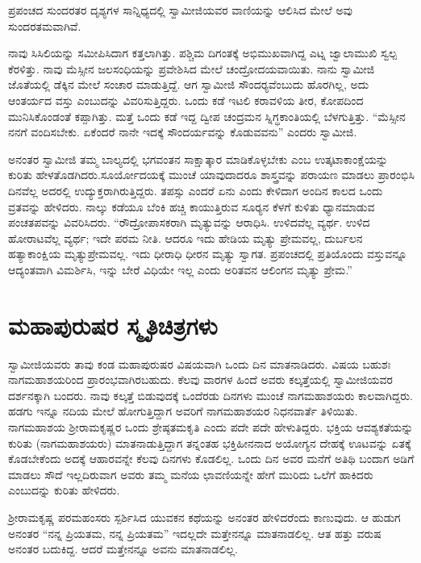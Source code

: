  ಪ್ರಪಂಚದ ಸುಂದರತರ ದೃಶ್ಯಗಳ ಸಾನ್ನಿಧ್ಯದಲ್ಲಿ ಸ್ವಾಮೀಜಿಯವರ ವಾಣಿಯನ್ನು ಆಲಿಸಿದ ಮೇಲೆ ಅವು ಸುಂದರತಮವಾಗಿವೆ. 

 ನಾವು ಸಿಸಿಲಿಯನ್ನು ಸಮೀಪಿಸಿದಾಗ ಕತ್ತಲಾಗಿತ್ತು. ಪಶ್ಚಿಮ ದಿಗಂತಕ್ಕೆ ಅಭಿಮುಖವಾಗಿದ್ದ ಎಟ್ನ ಜ್ವಾಲಾಮುಖಿ ಸ್ವಲ್ಪ ಕೆರಳಿತ್ತು. ನಾವು ಮೆಸ್ಸೀನ ಜಲಸಂಧಿಯನ್ನು ಪ್ರವೇಶಿಸಿದ ಮೇಲೆ ಚಂದ್ರೋದಯವಾಯಿತು. ನಾನು ಸ್ವಾಮೀಜಿ ಜೊತೆಯಲ್ಲಿ ಡೆಕ್ಕಿನ ಮೇಲೆ ಸಂಚಾರ ಮಾಡುತ್ತಿದ್ದೆ. ಆಗ ಸ್ವಾಮೀಜಿ ಸೌಂದರ‍್ಯವೆಂಬುದು ಹೊರಗಿಲ್ಲ, ಅದು ಆಂತರ್ಯದ ವಸ್ತು ಎಂಬುದನ್ನು ವಿವರಿಸುತ್ತಿದ್ದರು. ಒಂದು ಕಡೆ ಇಟಲಿ ಕರಾವಳಿಯ ತೀರ, ಕೋಪದಿಂದ ಮುನಿಸಿಕೊಂಡಂತೆ ಕಪ್ಪಾಗಿತ್ತು. ಮತ್ತೆ ಒಂದು ಕಡೆ ಇದ್ದ ದ್ವೀಪ ಚಂದ್ರಮನ ಸ್ನಿಗ್ಧಕಾಂತಿಯಲ್ಲಿ ಬೆಳಗುತ್ತಿತ್ತು. “ಮೆಸ್ಸೀನ ನನಗೆ ವಂದಿಸಬೇಕು. ಏಕೆಂದರೆ ನಾನೇ ಇದಕ್ಕೆ ಸೌಂದರ್ಯವನ್ನು ಕೊಡುವವನು” ಎಂದರು ಸ್ವಾಮೀಜಿ. 

 ಅನಂತರ ಸ್ವಾಮೀಜಿ ತಮ್ಮ ಬಾಲ್ಯದಲ್ಲಿ ಭಗವಂತನ ಸಾಕ್ಷಾತ್ಕಾರ ಮಾಡಿಕೊಳ್ಳಬೇಕು ಎಂಬ ಉತ್ಕಟಾಕಾಂಕ್ಷೆಯನ್ನು ಕುರಿತು ಹೇಳತೊಡಗಿದರು.\break ಸೂರ್ಯೋದಯಕ್ಕೆ ಮುಂಚೆ ಯಾವುದಾದರೂ ಶಾಸ್ತ್ರವನ್ನು ಪರಾಯಣ ಮಾಡಲು ಪ್ರಾರಂಭಿಸಿ ದಿನವೆಲ್ಲ ಅದರಲ್ಲಿ ಉದ್ಯುಕ್ತರಾಗಿರುತ್ತಿದ್ದರು. ತಪಸ್ಸು ಎಂದರೆ ಏನು ಎಂದು ಕೇಳಿದಾಗ ಅಂದಿನ ಕಾಲದ ಒಂದು ವ್ರತವನ್ನು ಹೇಳಿದರು. ನಾಲ್ಕು ಕಡೆಯೂ ಬೆಂಕಿ ಹಚ್ಚಿ ಕಾಯುತ್ತಿರುವ ಸೂರ‍್ಯನ ಕೆಳಗೆ ಕುಳಿತು ಧ್ಯಾನಮಾಡುವ ಪಂಚತಪವನ್ನು ವಿವರಿಸಿದರು. “ರೌದ್ರೋಪಾಸಕರಾಗಿ ಮೃತ್ಯುವನ್ನು ಆರಾಧಿಸಿ. ಉಳಿದವೆಲ್ಲ ವ್ಯರ್ಥ. ಉಳಿದ ಹೋರಾಟವೆಲ್ಲ ವ್ಯರ್ಥ; ಇದೇ ಪರಮ ನೀತಿ. ಆದರೂ‌ ಇದು ಹೇಡಿಯ ಮೃತ್ಯು ಪ್ರೇಮವಲ್ಲ, ದುರ್ಬಲನ ಹತ್ಯಾಕಾಂಕ್ಷಿಯ ಮೃತ್ಯುಪ್ರೇಮವಲ್ಲ. ಇದು ಧೀರಾಧಿ ಧೀರನ ಮೃತ್ಯು ಸ್ವಾಗತ. ಪ್ರಪಂಚದಲ್ಲಿ ಪ್ರತಿಯೊಂದು ವಸ್ತುವನ್ನೂ ಆದ್ಯಂತವಾಗಿ ವಿಮರ್ಶಿಸಿ, ಇನ್ನು ಬೇರೆ ವಿಧಿಯೇ ಇಲ್ಲ ಎಂದು ಅರಿತವನ ಆಲಿಂಗನ ಮೃತ್ಯು ಪ್ರೇಮ.”


\section*{ಮಹಾಪುರುಷರ ಸ್ಮೃತಿಚಿತ್ರಗಳು}

 ಸ್ವಾಮೀಜಿಯವರು ತಾವು ಕಂಡ ಮಹಾಪುರುಷರ ವಿಷಯವಾಗಿ ಒಂದು ದಿನ ಮಾತನಾಡಿದರು. ವಿಷಯ ಬಹುಶಃ ನಾಗಮಹಾಶಯರಿಂದ ಪ್ರಾರಂಭವಾಗಿರಬಹುದು. ಕೆಲವು ವಾರಗಳ ಹಿಂದೆ ಅವರು ಕಲ್ಕತ್ತೆಯಲ್ಲಿ ಸ್ವಾಮೀಜಿಯವರ ದರ್ಶನಕ್ಕಾಗಿ ಬಂದರು. ನಾವು ಕಲ್ಕತ್ತೆ ಬಿಡುವುದಕ್ಕೆ ಒಂದೆರಡು ದಿನಗಳು ಮುಂಚೆ ನಾಗಮಹಾಶಯರು ಕಾಲವಾಗಿದ್ದರು. ಹಡಗು ಇನ್ನೂ ನದಿಯ ಮೇಲೆ ಹೋಗುತ್ತಿದ್ದಾಗ ಅವರಿಗೆ ನಾಗಮಹಾಶಯರ ನಿಧನವಾರ್ತೆ ತಿಳಿಯಿತು. ನಾಗಮಹಾಶಯ ಶ‍್ರೀರಾಮಕೃಷ್ಣರ ಒಂದು ಶ್ರೇಷ್ಠತಮಕೃತಿ ಎಂದು ಪದೇ ಪದೇ ಹೇಳುತಿದ್ದರು. ಭಕ್ತಿಯ ಆವಶ್ಯಕತೆಯನ್ನು ಕುರಿತು (ನಾಗಮಹಾಶಯರು) ಮಾತನಾಡುತ್ತಿದ್ದಾಗ ತನ್ನಂತಹ ಭಕ್ತಿಹೀನನಾದ ಅಯೋಗ್ಯನ ದೇಹಕ್ಕೆ ಊಟವನ್ನು ಏತಕ್ಕೆ ಕೊಡಬೇಕೆಂದು ಅದಕ್ಕೆ ಆಹಾರವನ್ನೇ ಕೆಲವು ದಿನಗಳು ಕೊಡಲಿಲ್ಲ. ಒಂದು ದಿನ ಅವರ ಮನೆಗೆ ಅತಿಥಿ ಬಂದಾಗ ಅಡಿಗೆ ಮಾಡಲು ಸೌದೆ ಇಲ್ಲದಿರುವಾಗ ಅವರು ತಮ್ಮ ಮನೆಯ ಛಾವಣಿಯನ್ನೇ ಹೇಗೆ ಮುರಿದು ಒಲೆಗೆ ಹಾಕಿದರು ಎಂಬುದನ್ನು ಕುರಿತು ಹೇಳಿದರು. 

 ಶ‍್ರೀರಾಮಕೃಷ್ಣ ಪರಮಹಂಸರು ಸ್ಪರ್ಶಿಸಿದ ಯುವಕನ ಕಥೆಯನ್ನು ಅನಂತರ ಹೇಳಿದರೆಂದು ಕಾಣುವುದು. ಆ ಹುಡುಗ ಅನಂತರ “ನನ್ನ ಪ್ರಿಯತಮ, ನನ್ನ ಪ್ರಿಯತಮ” ಇದಲ್ಲದೇ ಮತ್ತೇನನ್ನೂ ಮಾತನಾಡಲಿಲ್ಲ. ಆತ ಹತ್ತು ವರುಷ ಅನಂತರ ಬದುಕಿದ್ದ. ಆದರೆ ಮತ್ತೇನನ್ನೂ ಅವನು ಮಾತನಾಡಲಿಲ್ಲ. 

